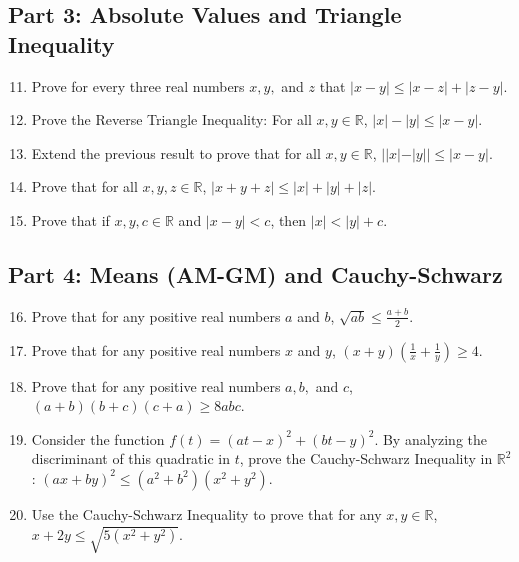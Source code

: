 \documentclass[11pt]{article}
\begin{document}
\subsection{Part 3: Absolute Values and Triangle Inequality}
\begin{enumerate}
    \setcounter{enumi}{10}
    \item Prove for every three real numbers $x, y,$ and $z$ that $|x - y| \le |x - z| + |z - y|$.
    \item Prove the Reverse Triangle Inequality: For all $x, y \in \mathbb{R}$, $|x| - |y| \le |x - y|$.
    \item Extend the previous result to prove that for all $x, y \in \mathbb{R}$, $||x| - |y|| \le |x - y|$.
    \item Prove that for all $x, y, z \in \mathbb{R}$, $|x + y + z| \le |x| + |y| + |z|$.
    \item Prove that if $x, y, c \in \mathbb{R}$ and $|x - y| < c$, then $|x| < |y| + c$.
\end{enumerate}

\subsection{Part 4: Means (AM-GM) and Cauchy-Schwarz}
\begin{enumerate}
    \setcounter{enumi}{15}
    \item Prove that for any positive real numbers $a$ and $b$, $\sqrt{ab} \le \frac{a+b}{2}$.
    \item Prove that for any positive real numbers $x$ and $y$, $(x+y)\left(\frac{1}{x} + \frac{1}{y}\right) \ge 4$.
    \item Prove that for any positive real numbers $a, b,$ and $c$, $(a+b)(b+c)(c+a) \ge 8abc$.
    \item Consider the function $f(t) = (at - x)^2 + (bt - y)^2$. By analyzing the discriminant of this quadratic in $t$, prove the Cauchy-Schwarz Inequality in $\mathbb{R}^2$: $(ax + by)^2 \le (a^2 + b^2)(x^2 + y^2)$.
    \item Use the Cauchy-Schwarz Inequality to prove that for any $x, y \in \mathbb{R}$, $x + 2y \le \sqrt{5(x^2 + y^2)}$.
\end{enumerate}
\end{document}
